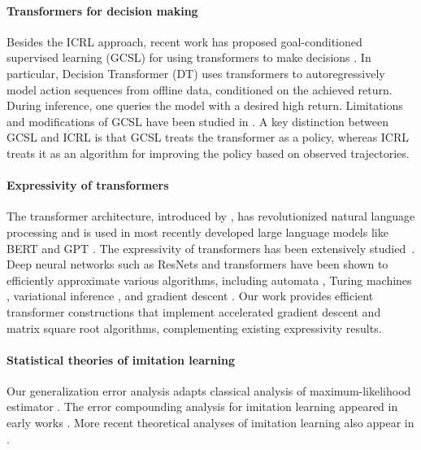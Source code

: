 \documentclass[10pt]{article}
\newcommand{\<}{\left\langle}
\renewcommand{\>}{\right\rangle}
\begin{document}
\paragraph{Transformers for decision making} Besides the ICRL approach, recent work has proposed goal-conditioned supervised learning (GCSL) for using transformers to make decisions \citep{chen2021decision, janner2021offline, lee2022multi, reed2022generalist, brohan2022rt, shafiullah2022behavior, yang2023foundation}. In particular, Decision Transformer (DT) \citep{chen2021decision, janner2021offline} uses transformers to autoregressively model action sequences from offline data, conditioned on the achieved return. During inference, one queries the model with a desired high return. Limitations and modifications of GCSL have been studied in \cite{yang2022dichotomy, paster2022you, vstrupl2022upside, brandfonbrener2022does}. A key distinction between GCSL and ICRL is that GCSL treats the transformer as a policy, whereas ICRL treats it as an algorithm for improving the policy based on observed trajectories. 



\paragraph{Expressivity of transformers} The transformer architecture, introduced by \cite{vaswani2017attention}, has revolutionized natural language processing and is used in most recently developed large language models like BERT and GPT \citep{devlin2018bert, brown2020language}. The expressivity of transformers has been extensively studied~\citep{yun2019transformers, perez2019turing, hron2020infinite,yao2021self, bhattamishra2020computational, zhang2022unveiling, liu2022transformers, wei2022statistically, fu2023can, bai2023transformers, akyurek2022learning, von2023transformers}. Deep neural networks such as ResNets and transformers have been shown to efficiently approximate various algorithms, including automata \citep{liu2022transformers}, Turing machines \citep{wei2022statistically}, variational inference \citep{mei2023deep}, and gradient descent \citep{bai2023transformers, akyurek2022learning, von2023transformers}. Our work provides efficient transformer constructions that implement accelerated gradient descent and matrix square root algorithms, complementing existing expressivity results. 





\paragraph{Statistical theories of imitation learning} Our generalization error analysis adapts classical analysis of maximum-likelihood estimator \citep{geer2000empirical}. The error compounding analysis for imitation learning appeared in early works \citep{ross2011reduction, ross2010efficient}. More recent theoretical analyses of imitation learning also appear in \cite{rajaraman2020toward, rajaraman2021provably, rashidinejad2021bridging}. 
\end{document}
